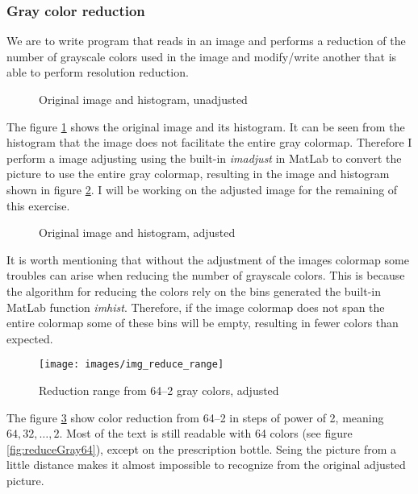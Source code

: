 \documentclass[a4paper, 10pt, final]{article}
\begin{document}
\subsubsection*{Gray color reduction}
We are to write program that reads in an image and performs a reduction of the number of grayscale colors used in the image and modify/write another that is able to perform resolution reduction.

\begin{figure}[!h]
\centering
{}
\caption{Original image and histogram, unadjusted}
\label{fig:original}
\end{figure}
The figure \ref{fig:original} shows the original image and its histogram. It can be seen from the histogram that the image does not facilitate the entire gray colormap. Therefore I perform a image adjusting using the built-in \emph{imadjust} in MatLab to convert the picture to use the entire gray colormap, resulting in the image and histogram shown in figure \ref{fig:original_adjusted}. I will be working on the adjusted image for the remaining of this exercise. 

\begin{figure}[!h]
\centering
{}
\caption{Original image and histogram, adjusted}
\label{fig:original_adjusted}
\end{figure}

It is worth mentioning that without the adjustment of the images
colormap some troubles can arise when reducing the number of grayscale
colors. This is because the algorithm for reducing the colors rely on
the bins generated the built-in MatLab function
\emph{imhist}. Therefore, if the image colormap does not span the
entire colormap some of these bins will be empty, resulting in fewer
colors than expected.

\begin{figure}[!h]
\centering
\texttt{[image: images/img\_reduce\_range]}
\caption{Reduction range from 64--2 gray colors, adjusted}
\label{fig:reduceGray_range}
\end{figure}
The figure \ref{fig:reduceGray_range} show color reduction from 64--2 in steps of power of 2, meaning $64, 32, \ldots, 2$. Most of the text is still readable with 64 colors (see figure \ref{fig:reduceGray64}), except on the prescription bottle. Seing the picture from a little distance makes it almost impossible to recognize from the original adjusted picture.
\end{document}
